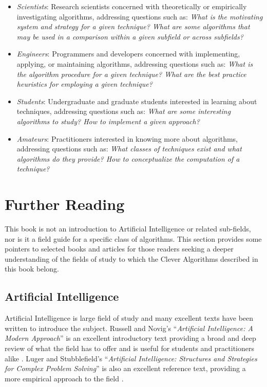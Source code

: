 \begin{bibunit}
\begin{itemize}
	\item \emph{Scientists}: Research scientists concerned with theoretically or empirically investigating algorithms, addressing questions such as: \emph{What is the motivating system and strategy for a given technique? What are some algorithms that may be used in a comparison within a given subfield or across subfields?}
	\item \emph{Engineers}: Programmers and developers concerned with implementing, applying, or maintaining algorithms, addressing questions such as: \emph{What is the algorithm procedure for a given technique? What are the best practice heuristics for employing a given technique?}
	\item \emph{Students}: Undergraduate and graduate students interested in learning about techniques, addressing questions such as: \emph{What are some interesting algorithms to study? How to implement a given approach?}
	\item \emph{Amateurs}: Practitioners interested in knowing more about algorithms, addressing questions such as: \emph{What classes of techniques exist and what algorithms do they provide? How to conceptualize the computation of a technique?}
\end{itemize}

% 
% 
\section{Further Reading}
\label{intro:sec:further_reading}
This book is not an introduction to Artificial Intelligence or related sub-fields, nor is it a field guide for a specific class of algorithms. This section provides some pointers to selected books and articles for those readers seeking a deeper understanding of the fields of study to which the Clever Algorithms described in this book belong.

% 
% 
\subsection{Artificial Intelligence}
Artificial Intelligence is large field of study and many excellent texts have been written to introduce the subject. Russell and Novig's ``\emph{Artificial Intelligence: A Modern Approach}'' is an excellent introductory text providing a broad and deep review of what the field has to offer and is useful for students and practitioners alike \cite{Russell2009}. Luger and Stubblefield's ``\emph{Artificial Intelligence: Structures and Strategies for Complex Problem Solving}'' is also an excellent reference text, providing a more empirical approach to the field \cite{Luger1993}.


\end{bibunit}
